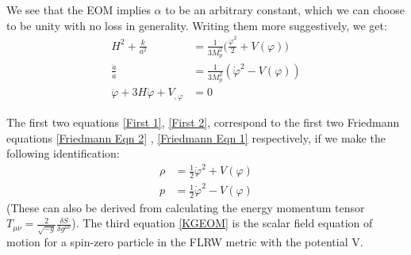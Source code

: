 \documentclass[aps,prd,reprint,preprintnumbers,showpacs,floatfix,nofootinbib,superscript address]{revtex4-2}
\begin{document}
We see that the EOM implies $\alpha$ to be an arbitrary constant, which we can choose to be unity with no loss in generality. Writing them more suggestively, we get:
\begin{align}
    H^2 + \frac{k}{a^2} &= \frac{1}{3M_p^2} \bigg( \frac{\dot{\varphi}^2}{2} + V(\varphi) \bigg) \label{First 1} \\
    \frac{ \ddot{a}}{a}  &=  \frac{1}{3M_p^2}\left(\dot{\varphi}^2 - V(\varphi) \right) \label{First 2} \\
    \ddot{\varphi} + 3H\dot{\varphi} + V_{,\varphi} &= 0    \label{KGEOM}
\end{align}

The first two equations \ref{First 1}, \ref{First 2}, correspond to the first two Friedmann equations \ref{Friedmann Eqn 2} , \ref{Friedmann Eqn 1} respectively, if we make the following identification:
\begin{align}   \label{presure and density}
    \rho &= \frac{1}{2} \dot{\varphi}^2 + V(\varphi) \nonumber \\
    p &= \frac{1}{2} \dot{\varphi}^2 - V(\varphi)
\end{align}
(These can also be derived from calculating the energy momentum tensor $T_{\mu\nu} = \frac{2}{\sqrt{-g}} \frac{\delta S}{\delta  g^{\mu \nu}}$).
The third equation \ref{KGEOM} is the scalar field equation of motion for a spin-zero particle in the FLRW metric with the potential V. 

\end{document}
